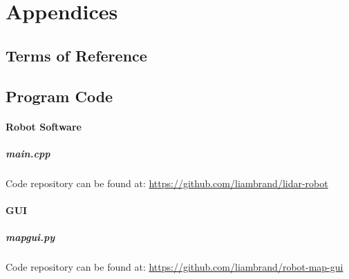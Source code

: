 \part{Appendices}
	\begin{appendices}
	\chapter{Terms of Reference}
	
	\chapter{Program Code}
		\subsection{Robot Software}
			\subsubsection{main.cpp}
			Code repository can be found at: \url{https://github.com/liambrand/lidar-robot}
			
		\subsection{GUI}
			\subsubsection{mapgui.py}
			Code repository can be found at: \url{https://github.com/liambrand/robot-map-gui}
			

\end{appendices}
